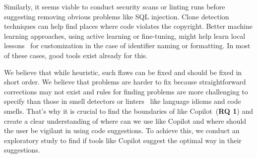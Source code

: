 Similarly, it seems viable to conduct security scans or linting runs before suggesting removing obvious problems like SQL injection. 
Clone detection techniques can help find places where code violates the copyright. 
Better machine learning approaches, using active learning or fine-tuning, might help learn local lessons~\cite{Menzies2013} for customization in the case of identifier naming or formatting.
In most of these cases, good tools exist already for this. 

We believe that while heuristic, such flaws can be fixed and should be fixed in short order. 
We believe that problems are harder to fix because straightforward corrections may not exist and rules for finding problems are more challenging to specify than those in smell detectors or linters~\cite{Ernst2017} like language idioms and code smells. That's why it is crucial to find the boundaries of \cct{} like Copilot~(\textbf{RQ 1}) and create a clear understanding of where can we use \cct{} like Copilot and where should the user be vigilant in using \cct{} code suggestions.
To achieve this, we conduct an exploratory study to find if \cct{} tools like Copilot suggest the optimal way in their suggestions.